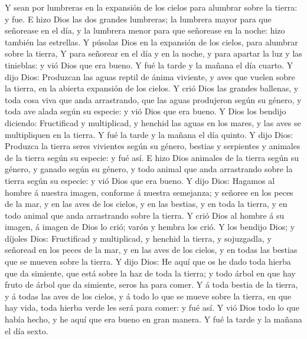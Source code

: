 Y sean por lumbreras en la expansión de los cielos para alumbrar sobre la tierra: y fue. 
E hizo Dios las dos grandes lumbreras; la lumbrera mayor para que señorease en el día, y la lumbrera menor para que señorease en la noche: hizo también las estrellas. 
Y púsolas Dios en la expansión de los cielos, para alumbrar sobre la tierra, 
Y para señorear en el día y en la noche, y para apartar la luz y las tinieblas: y vió Dios que era bueno. 
Y fué la tarde y la mañana el día cuarto. 
Y dijo Dios: Produzcan las aguas reptil de ánima viviente, y aves que vuelen sobre la tierra, en la abierta expansión de los cielos. 
Y crió Dios las grandes ballenas, y toda cosa viva que anda arrastrando, que las aguas produjeron según su género, y toda ave alada según su especie: y vió Dios que era bueno. 
Y Dios los bendijo diciendo: Fructificad y multiplicad, y henchid las aguas en los mares, y las aves se multipliquen en la tierra. 
Y fué la tarde y la mañana el día quinto. 
Y dijo Dios: Produzca la tierra seres vivientes según su género, bestias y serpientes y animales de la tierra según su especie: y fué así. 
E hizo Dios animales de la tierra según su género, y ganado según su género, y todo animal que anda arrastrando sobre la tierra según su especie: y vió Dios que era bueno. 
Y dijo Dios: Hagamos al hombre á nuestra imagen, conforme á nuestra semejanza; y señoree en los peces de la mar, y en las aves de los cielos, y en las bestias, y en toda la tierra, y en todo animal que anda arrastrando sobre la tierra. 
Y crió Dios al hombre á su imagen, á imagen de Dios lo crió; varón y hembra los crió. 
Y los bendijo Dios; y díjoles Dios: Fructificad y multiplicad, y henchid la tierra, y sojuzgadla, y señoread en los peces de la mar, y en las aves de los cielos, y en todas las bestias que se mueven sobre la tierra. 
Y dijo Dios: He aquí que os he dado toda hierba que da simiente, que está sobre la haz de toda la tierra; y todo árbol en que hay fruto de árbol que da simiente, seros ha para comer. 
Y á toda bestia de la tierra, y á todas las aves de los cielos, y á todo lo que se mueve sobre la tierra, en que hay vida, toda hierba verde les será para comer: y fué así. 
Y vió Dios todo lo que había hecho, y he aquí que era bueno en gran manera. Y fué la tarde y la mañana el día sexto. 

